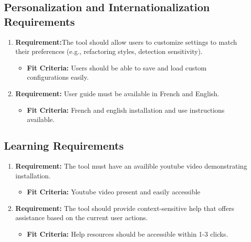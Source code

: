 \documentclass[12pt]{article}
\begin{document}
\subsection{Personalization and Internationalization Requirements}
\begin{enumerate}
  \item \textbf{Requirement:}The tool should allow users to customize settings to match their preferences (e.g., refactoring styles, detection sensitivity).
  \begin{itemize}[label={}]
      \item \textbf{Fit Criteria:}  Users should be able to save and load custom configurations easily.
  \end{itemize}
  \item \textbf{Requirement:} User guide must be available in French and English.
  \begin{itemize}[label={}]
      \item \textbf{Fit Criteria:} French and english installation and use instructions available.
  \end{itemize} 
\end{enumerate}
\subsection{Learning Requirements}
\begin{enumerate}
  \item \textbf{Requirement:} The tool must have an availible youtube video demonstrating installation.
  \begin{itemize}[label={}]
      \item \textbf{Fit Criteria:}  Youtube video present and easily accessible
  \end{itemize}
  \item \textbf{Requirement:} The tool should provide context-sensitive help that offers assistance based on the current user actions.
  \begin{itemize}[label={}]
      \item \textbf{Fit Criteria:} Help resources should be accessible within 1-3 clicks.
  \end{itemize}
\end{enumerate}
\end{document}
